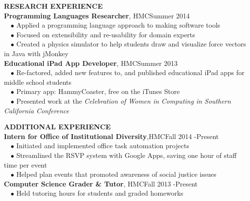 \documentclass[11pt]{article}
\newcommand{\sectionNL}{\\[-2pt]}
\newcommand{\customtab}{$\hspace{10pt} \bullet \hspace{2pt}$}
\newcommand{\customtabinline}{$\hspace{23pt}$}
\newcommand{\HMC}{HMC}
\newcommand{\rightAlign}{\hfill}
\begin{document}
\begin{flushleft}
{\textbf{RESEARCH EXPERIENCE}} \sectionNL
\textbf{Programming Languages Researcher}, \HMC \rightAlign Summer 2014 \\
\customtab Applied a programming language approach to making software tools \\
\customtab Focused on extensibility and re-usability for domain experts \\ 
\customtab Created a physics simulator to help students draw and visualize force vectors in Java with jMonkey\\

\textbf{Educational iPad App Developer}, \HMC \rightAlign Summer 2013 \\
\customtab Re-factored, added new features to, and published educational iPad apps for middle school students \\
\customtab Primary app: HammyCoaster, free on the iTunes Store \\
\customtab Presented work at the \textit{Celebration of Women in Computing in Southern California Conference }
\end{flushleft}

\begin{flushleft}
{\textbf{ADDITIONAL EXPERIENCE } } \sectionNL
\textbf{Intern for Office of Institutional Diversity},\HMC \rightAlign Fall 2014 -Present \\
\customtab Initiated and implemented office task automation projects\\
\customtab Streamlined the RSVP system with Google Apps, saving one hour of staff time per event  \\
\customtab Helped plan events that promoted awareness of social justice issues \\

\textbf{Computer Science Grader \& Tutor}, \HMC \rightAlign Fall 2013 -Present \\ %
\customtab Held tutoring hours for students and graded homeworks

\end{flushleft}
\end{document}
